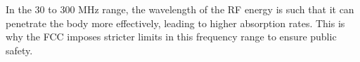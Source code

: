 In the 30 to 300 MHz range, the wavelength of the RF energy is such that it can penetrate the body more effectively, leading to higher absorption rates. This is why the FCC imposes stricter limits in this frequency range to ensure public safety.

